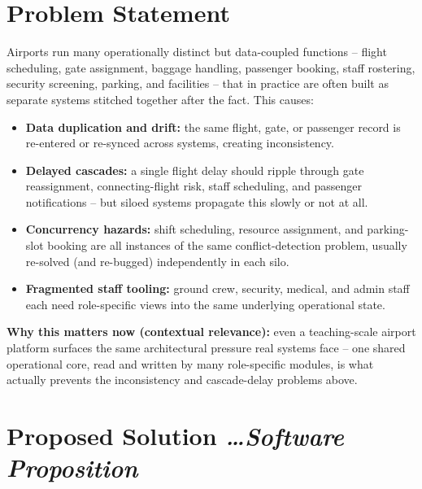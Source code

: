 \documentclass[11pt,a4paper]{article}
\newcommand{\BvrHint}[1]{%
  {\normalfont\normalsize\itshape\hfill #1}}
\begin{document}
\section{Problem Statement}
Airports run many operationally distinct but data-coupled functions
-- flight scheduling, gate assignment, baggage handling, passenger
booking, staff rostering, security screening, parking, and facilities
-- that in practice are often built as separate systems stitched
together after the fact. This causes:
\begin{itemize}[leftmargin=0.7cm]
    \item \textbf{Data duplication and drift:} the same flight, gate,
      or passenger record is re-entered or re-synced across systems,
      creating inconsistency.
    \item \textbf{Delayed cascades:} a single flight delay should
      ripple through gate reassignment, connecting-flight risk,
      staff scheduling, and passenger notifications -- but siloed
      systems propagate this slowly or not at all.
    \item \textbf{Concurrency hazards:} shift scheduling, resource
      assignment, and parking-slot booking are all instances of the
      same conflict-detection problem, usually re-solved (and
      re-bugged) independently in each silo.
    \item \textbf{Fragmented staff tooling:} ground crew, security,
      medical, and admin staff each need role-specific views into the
      same underlying operational state.
\end{itemize}

\textbf{Why this matters now (contextual relevance):} even a
teaching-scale airport platform surfaces the same architectural
pressure real systems face -- one shared operational core, read and
written by many role-specific modules, is what actually prevents the
inconsistency and cascade-delay problems above.

\section{Proposed Solution %
\BvrHint{\ldots Software Proposition}}
\end{document}
